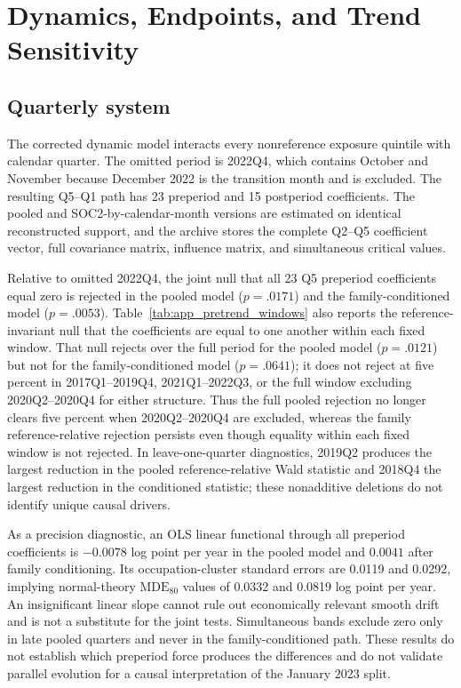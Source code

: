 \section{Dynamics, Endpoints, and Trend Sensitivity}\label{app:dynamics}

\subsection{Quarterly system}

The corrected dynamic model interacts every nonreference exposure quintile with calendar quarter.  The omitted period is 2022Q4, which contains October and November because December 2022 is the transition month and is excluded.  The resulting Q5--Q1 path has 23 preperiod and 15 postperiod coefficients.  The pooled and SOC2-by-calendar-month versions are estimated on identical reconstructed support, and the archive stores the complete Q2--Q5 coefficient vector, full covariance matrix, influence matrix, and simultaneous critical values.

Relative to omitted 2022Q4, the joint null that all 23 Q5 preperiod
coefficients equal zero is rejected in the pooled model ($p=.0171$) and the
family-conditioned model ($p=.0053$).  Table~\ref{tab:app_pretrend_windows}
also reports the reference-invariant null that the coefficients are equal to
one another within each fixed window.  That null rejects over the full period
for the pooled model ($p=.0121$) but not for the family-conditioned model
($p=.0641$); it does not reject at five percent in 2017Q1--2019Q4,
2021Q1--2022Q3, or the full window excluding 2020Q2--2020Q4 for either
structure.  Thus the full pooled rejection no longer clears five percent when
2020Q2--2020Q4 are excluded, whereas the family reference-relative rejection
persists even though equality within each fixed window is not rejected.  In
leave-one-quarter diagnostics,
2019Q2 produces the largest reduction in the pooled reference-relative Wald
statistic and 2018Q4 the largest reduction in the conditioned statistic; these
nonadditive deletions do not identify unique causal drivers.



As a precision diagnostic, an OLS linear functional through all preperiod
coefficients is $-0.0078$ log point per year in the pooled model and $0.0041$
after family conditioning.  Its occupation-cluster standard errors are 0.0119
and 0.0292, implying normal-theory $\mathrm{MDE}_{80}$ values of 0.0332 and
0.0819 log point per year.  An insignificant linear slope cannot rule out
economically relevant smooth drift and is not a substitute for the joint
tests.  Simultaneous bands exclude zero only in late pooled quarters and never
in the family-conditioned path.  These results do not establish which
preperiod force produces the differences and do not validate parallel
evolution for a causal interpretation of the January 2023 split.

